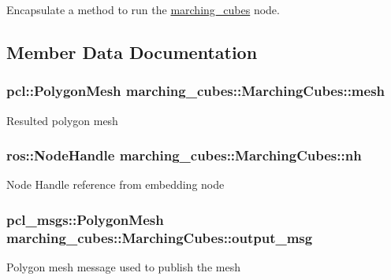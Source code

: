 Encapsulate a method to run the \hyperlink{namespacemarching__cubes}{marching\+\_\+cubes} node. 



\subsection{Member Data Documentation}
\subsubsection[{\texorpdfstring{mesh}{mesh}}]{\setlength{\rightskip}{0pt plus 5cm}pcl\+::\+Polygon\+Mesh marching\+\_\+cubes\+::\+Marching\+Cubes\+::mesh\hspace{0.3cm}{\ttfamily [private]}}\hypertarget{classmarching__cubes_1_1_marching_cubes_a169d75a95f59aa253a12d5322852f95d}{}\label{classmarching__cubes_1_1_marching_cubes_a169d75a95f59aa253a12d5322852f95d}
Resulted polygon mesh 
\subsubsection[{\texorpdfstring{nh}{nh}}]{\setlength{\rightskip}{0pt plus 5cm}ros\+::\+Node\+Handle marching\+\_\+cubes\+::\+Marching\+Cubes\+::nh\hspace{0.3cm}{\ttfamily [private]}}\hypertarget{classmarching__cubes_1_1_marching_cubes_a892881775be45a5cc1de7f19ca57e8d0}{}\label{classmarching__cubes_1_1_marching_cubes_a892881775be45a5cc1de7f19ca57e8d0}
Node Handle reference from embedding node 
\subsubsection[{\texorpdfstring{output\+\_\+msg}{output_msg}}]{\setlength{\rightskip}{0pt plus 5cm}pcl\+\_\+msgs\+::\+Polygon\+Mesh marching\+\_\+cubes\+::\+Marching\+Cubes\+::output\+\_\+msg\hspace{0.3cm}{\ttfamily [private]}}\hypertarget{classmarching__cubes_1_1_marching_cubes_a355aafbff47eae3e8ce9829a96c70f89}{}\label{classmarching__cubes_1_1_marching_cubes_a355aafbff47eae3e8ce9829a96c70f89}
Polygon mesh message used to publish the mesh 
